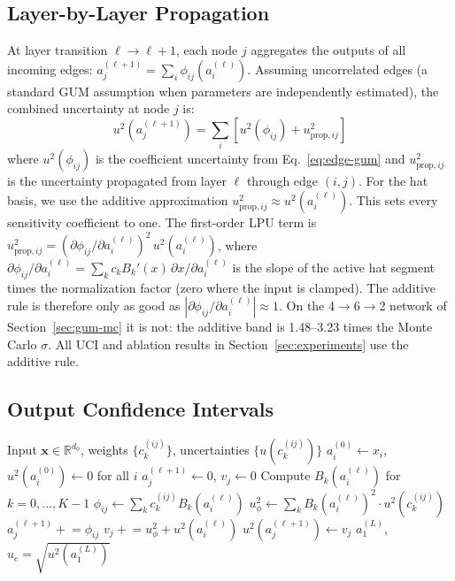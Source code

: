 \documentclass{article}
\begin{document}
\subsection{Layer-by-Layer Propagation}
\label{sec:layer-gum}

At layer transition $\ell \to \ell{+}1$, each node $j$ aggregates the outputs
of all incoming edges:
$a_j^{(\ell+1)} = \sum_i \phi_{ij}(a_i^{(\ell)})$.  Assuming uncorrelated
edges (a standard GUM assumption when parameters are independently
estimated), the combined uncertainty at node $j$ is:
\begin{equation}
  u^2(a_j^{(\ell+1)}) = \sum_i \left[ u^2(\phi_{ij}) + u^2_{\text{prop},ij} \right]
  \label{eq:layer-gum}
\end{equation}
where $u^2(\phi_{ij})$ is the coefficient uncertainty from
Eq.~\ref{eq:edge-gum} and $u^2_{\text{prop},ij}$ is the uncertainty
propagated from layer $\ell$ through edge $(i,j)$.  For the hat basis, we
use the additive approximation
$u^2_{\text{prop},ij} \approx u^2(a_i^{(\ell)})$.  This sets every
sensitivity coefficient to one.  The first-order LPU term is
$u^2_{\text{prop},ij} = (\partial\phi_{ij}/\partial a_i^{(\ell)})^2\,
u^2(a_i^{(\ell)})$, where $\partial\phi_{ij}/\partial a_i^{(\ell)} =
\sum_k c_k B_k'(x)\,\partial x/\partial a_i^{(\ell)}$ is the slope of the
active hat segment times the normalization factor (zero where the input is
clamped).  The additive rule is therefore only as good as $|\partial\phi_{ij}/
\partial a_i^{(\ell)}| \approx 1$.  On the 4$\to$6$\to$2 network of
Section~\ref{sec:gum-mc} it is not: the additive band is 1.48--3.23 times
the Monte Carlo $\sigma$.  All UCI and ablation results in
Section~\ref{sec:experiments} use the additive rule.

\subsection{Output Confidence Intervals}


\begin{algorithm}
\caption{E-KAN Forward Pass with GUM Uncertainty}
\label{alg:ekan}
\begin{algorithmic}[1]
\REQUIRE Input $\mathbf{x} \in \mathbb{R}^{d_0}$, weights $\{c_k^{(ij)}\}$,
         uncertainties $\{u(c_k^{(ij)})\}$
\STATE $a_i^{(0)} \gets x_i$, \; $u^2(a_i^{(0)}) \gets 0$ \; for all $i$
    \STATE $a_j^{(\ell+1)} \gets 0$, \; $v_j \gets 0$
      \STATE Compute $B_k(a_i^{(\ell)})$ for $k = 0, \ldots, K{-}1$
      \STATE $\phi_{ij} \gets \sum_k c_k^{(ij)} B_k(a_i^{(\ell)})$
      \STATE $u^2_\phi \gets \sum_k B_k(a_i^{(\ell)})^2 \cdot u^2(c_k^{(ij)})$
      \STATE $a_j^{(\ell+1)} \mathrel{+}= \phi_{ij}$
      \STATE $v_j \mathrel{+}= u^2_\phi + u^2(a_i^{(\ell)})$
    \ENDFOR
    \STATE $u^2(a_j^{(\ell+1)}) \gets v_j$
  \ENDFOR
\ENDFOR
\RETURN $a_1^{(L)}$, \; $u_c = \sqrt{u^2(a_1^{(L)})}$
\end{algorithmic}
\end{algorithm}
\end{document}
